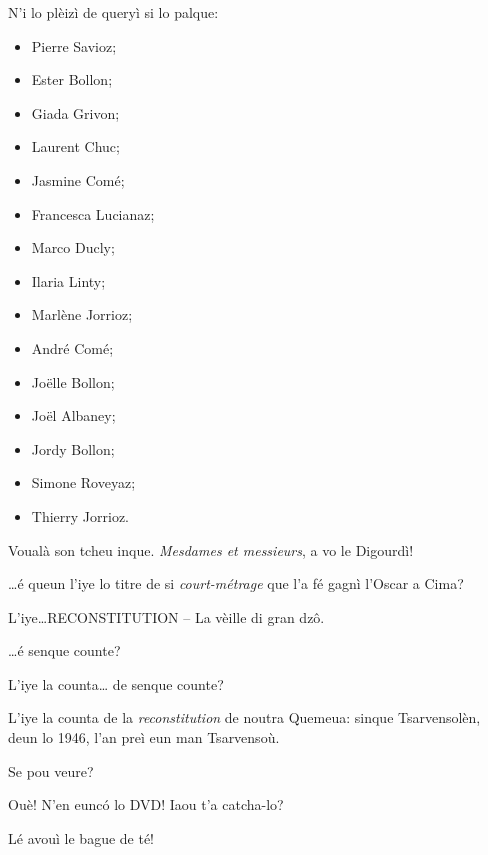 \begin{drama}
\Conducteurspeaks N'i lo plèizì de queryì si lo palque:
\begin{itemize}
\item[$\bullet$] Pierre Savioz;
\item[$\bullet$] Ester Bollon;
\item[$\bullet$] Giada Grivon;
\item[$\bullet$] Laurent Chuc;
\item[$\bullet$] Jasmine Comé;
\item[$\bullet$] Francesca Lucianaz;
\item[$\bullet$] Marco Ducly;
\item[$\bullet$] Ilaria Linty;
\item[$\bullet$] Marlène Jorrioz;
\item[$\bullet$] André Comé;
\item[$\bullet$] Jo\"{e}lle Bollon;
\item[$\bullet$] Jo\"{e}l Albaney;
\item[$\bullet$] Jordy Bollon;
\item[$\bullet$] Simone Roveyaz;
\item[$\bullet$] Thierry Jorrioz.
\end{itemize}


\Conducteurspeaks Voualà son tcheu inque. \textit{Mesdames et messieurs}, a vo le Digourdì!




\Nevaouspeaks \ldots é queun l'iye lo titre de si \textit{court-métrage} que l'a fé gagnì l’Oscar a Cima?

\Paganspeaks L'iye\ldots \og RECONSTITUTION – La vèille di gran dz\^o\fg.

\Nevaousaspeaks \ldots é senque counte?

\Paganspeaks L'iye la counta\ldots {} de senque counte?

\Maganspeaks L'iye la counta de la \textit{reconstitution} de noutra Quemeua: sinque Tsarvensolèn, deun lo 1946, l'an preì eun man Tsarvensoù.

\Nevaouspeaks Se pou veure?

\Paganspeaks Ouè! N'en euncó lo DVD!  Iaou t'a catcha-lo?

\Maganspeaks Lé avouì le bague de té!


\end{drama}
